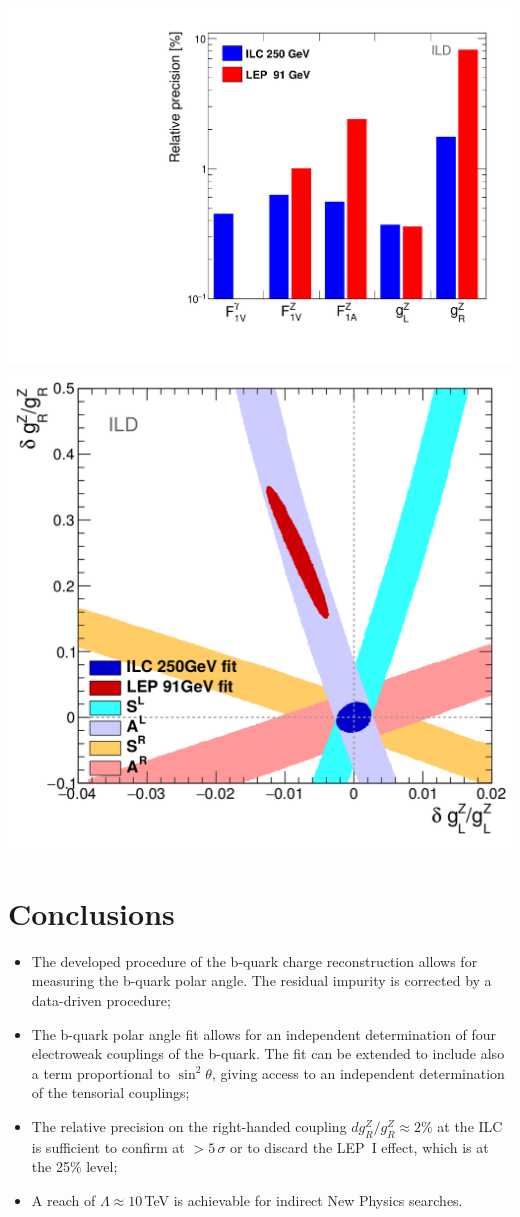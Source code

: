 \begin{center}
	\includegraphics[width=0.4\linewidth]{plots/final-graph-ild.pdf}
	\includegraphics[width=0.4\linewidth]{plots/ilc-precision-ild.png}
		\label{fig:LEPILCResult_3}
\end{center}\vspace{0.5cm}


\color{Blue} %

\section*{Conclusions}

\begin{itemize}
\item The developed procedure of the b-quark charge reconstruction allows for measuring the b-quark polar angle. The residual impurity is corrected by a data-driven procedure;
\item The b-quark polar angle fit allows for an independent determination of four electroweak couplings of the b-quark. The fit can be extended to include also a term proportional to $\sin^2\theta$, giving access to an independent determination of the tensorial couplings;
\item  The relative precision on the right-handed coupling $dg^Z_R/g^Z_R\approx 2$\% at the ILC is sufficient to confirm at $>5\,\sigma$ or to discard the LEP~I effect, which is at the 25\% level;
\item A reach of $\Lambda \approx 10$\,TeV is achievable for indirect New Physics searches.
\end{itemize}

